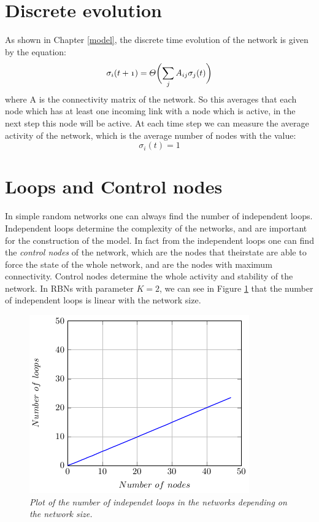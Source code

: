 \section{Discrete evolution}
As shown in Chapter \ref{model}, the discrete time evolution of the network is given by the equation:
$$
\mathnormal{\sigma_i(t+1)=\Theta\biggl(\sum_jA_{ij}\sigma_j(t)\biggr)}
$$
where A is the connectivity matrix of the network.
So this averages that each node which has at least one incoming link with a node which is active, in the next step this node will be active.
At each time step we can measure the average activity of the network, which is the average number of nodes with the value:
$$
\sigma_i(t) = 1
$$


\section{Loops and Control nodes}
In simple random networks one can always find the number of independent loops.
Independent loops determine the complexity of the networks\cite{K38}, and are important for the construction of the model. In fact from the independent loops one can find the \emph{control nodes} of the network, which are the nodes that theirstate are able to force the state of the whole network, and are the nodes with maximum connectivity. Control nodes determine the whole activity and stability of the network. 
In RBNs with parameter $K=2$, we can see in Figure \ref{fig:loops} that the number of independent loops is linear with the network size.
\begin{figure}[h]
\centering
\includegraphics[scale=1.5]{images/loops.pdf}
\caption{\emph{Plot of the number of independet loops in the networks depending on the network size.}}
\label{fig:loops}
\end{figure}



